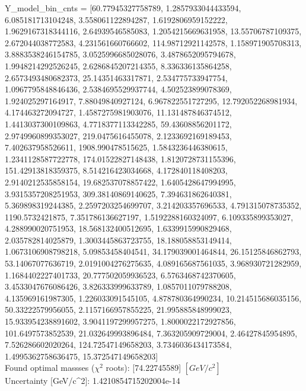 \documentclass[12pt]{article}
\begin{document}
	Y\_model\_bin\_cnts = [60.77945327758789, 1.2857933044433594, 6.085181713104248, 3.558061122894287, 1.6192806959152222, 1.9629167318344116, 2.64939546585083, 1.2054215669631958, 13.55706787109375, 2.672044038772583, 4.231561660766602, 114.98712921142578, 1.158971905708313, 3.8883538246154785, 3.0525996685028076, 3.4878652095794678, 1.9948214292526245, 2.6286845207214355, 8.336336135864258, 2.6573493480682373, 25.14351463317871, 2.534775733947754, 1.0967795848846436, 2.5384695529937744, 4.502523899078369, 1.924025297164917, 7.88049840927124, 6.967822551727295, 12.792052268981934, 4.174463272094727, 1.4587275981903076, 11.131487846374512, 1.4413037300109863, 4.7718377113342285, 59.43608856201172, 2.9749960899353027, 219.0475616455078, 2.1233692169189453, 7.402637958526611, 1908.990478515625, 1.5843236446380615, 1.2341128587722778, 174.01522827148438, 1.8120728731155396, 151.42913818359375, 8.514216423034668, 4.172840118408203, 2.9140212535858154, 19.682537078857422, 1.6405428647994995, 3.9315357208251953, 309.38140869140625, 7.394631862640381, 5.369898319244385, 2.2597203254699707, 3.214203357696533, 4.791315078735352, 1190.5732421875, 7.351786136627197, 1.5192288160324097, 6.109335899353027, 4.288990020751953, 18.568132400512695, 1.6339915990829468, 2.035782814025879, 1.3003445863723755, 18.188058853149414, 1.0673106908798218, 5.09853458404541, 34.179039001464844, 26.15125846862793, 53.14067077636719, 2.0191004276275635, 4.089165687561035, 3.968930721282959, 1.1684402227401733, 20.777502059936523, 6.5763468742370605, 3.4533047676086426, 3.826333999633789, 1.0857011079788208, 4.135969161987305, 1.226033091545105, 4.878780364990234, 10.214515686035156, 50.33222579956055, 2.1157166957855225, 21.995885848999023, 15.933954238891602, 3.9041197299957275, 1.8000022172927856, 101.6497573852539, 21.032649993896484, 7.363205909729004, 2.46427845954895, 7.526286602020264, 124.72547149658203, 3.7346036434173584, 1.4995362758636475, 15.372547149658203]\\

    Found optimal massses ($\chi^2$ roots): [74.22745589] $[GeV/c^{2}]$\\
    Uncertainty [GeV/c^2]: 1.4210854715202004e-14\\
\end{document}
